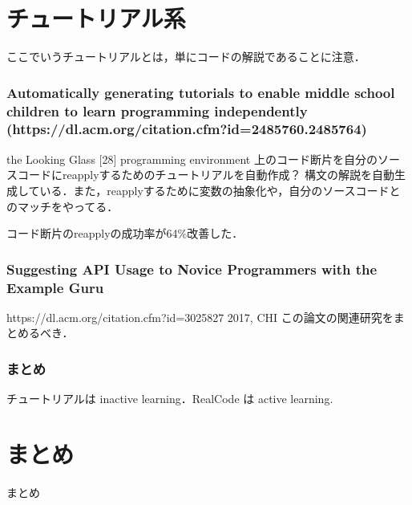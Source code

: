 \section{チュートリアル系}

ここでいうチュートリアルとは，単にコードの解説であることに注意．

\subsubsection*{Automatically generating tutorials to enable middle school children to learn programming independently (https://dl.acm.org/citation.cfm?id=2485760.2485764)}

the Looking Glass [28] programming environment 上のコード断片を自分のソースコードにreapplyするためのチュートリアルを自動作成？
構文の解説を自動生成している．また，reapplyするために変数の抽象化や，自分のソースコードとのマッチをやってる．

コード断片のreapplyの成功率が64\%改善した．

\subsubsection*{Suggesting API Usage to Novice Programmers with the Example Guru}
https://dl.acm.org/citation.cfm?id=3025827
2017, CHI
この論文の関連研究をまとめるべき．


\subsubsection{まとめ}

チュートリアルは inactive learning．RealCode は active learning.



\section{まとめ}
まとめ


